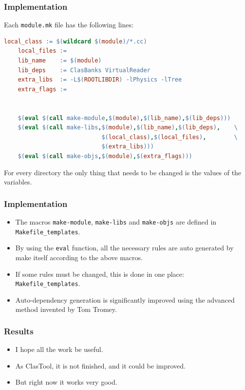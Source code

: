 \documentclass[11pt]{beamer}
\begin{document}

\begin{frame}[fragile]
  \frametitle{Implementation}
  Each \texttt{module.mk} file has the following lines:

  \begin{lstlisting}[language=make]
    local_class := $(wildcard $(module)/*.cc)
    local_files :=
    lib_name    := $(module)
    lib_deps    := ClasBanks VirtualReader
    extra_libs  := -L$(ROOTLIBDIR) -lPhysics -lTree
    extra_flags := 
    
    
    $(eval $(call make-module,$(module),$(lib_name),$(lib_deps)))
    $(eval $(call make-libs,$(module),$(lib_name),$(lib_deps),    \
                            $(local_class),$(local_files),        \
                            $(extra_libs)))
    $(eval $(call make-objs,$(module),$(extra_flags)))
  \end{lstlisting}

  For every directory the only thing that needs to be changed is the values of
  the variables.
\end{frame}


\begin{frame}
  \frametitle{Implementation}
  \begin{itemize}
    \item The macros \texttt{make-module}, \texttt{make-libs} and
      \texttt{make-objs} are defined in \texttt{Makefile\_templates}.\\[4mm]
    \item By using the \texttt{eval} function, all the necessary rules are
      auto generated by make itself according to the above macros.\\[4mm]
    \item If some rules must be changed, this is done in one place:
      \texttt{Makefile\_templates}.\\[4mm]
    \item Auto-dependency generation is significantly improved using the
      advanced method invented by Tom Tromey.
  \end{itemize}
\end{frame}


\begin{frame}
  \frametitle{Results}
  \begin{itemize}
    \item I hope all the work be useful.\\[5mm]
    \item As ClasTool, it is not finished, and it could be improved.\\[8mm]
    \item<2> But right now it works very good.
  \end{itemize}
\end{frame}
\end{document}
